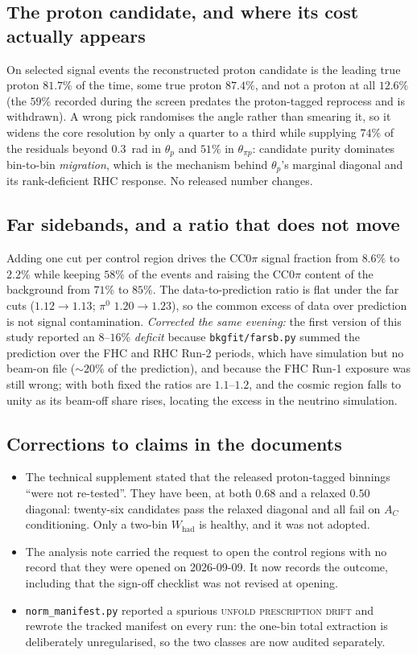 \subsection{The proton candidate, and where its cost actually appears}
On selected signal events the reconstructed proton candidate is the leading true proton $81.7\%$ of
the time, some true proton $87.4\%$, and not a proton at all $12.6\%$ (the $59\%$ recorded during
the screen predates the proton-tagged reprocess and is withdrawn). A wrong pick randomises the angle
rather than smearing it, so it widens the core resolution by only a quarter to a third while
supplying $74\%$ of the residuals beyond $0.3$~rad in $\theta_p$ and $51\%$ in $\theta_{\pi p}$:
candidate purity dominates bin-to-bin \emph{migration}, which is the mechanism behind $\theta_p$'s
marginal diagonal and its rank-deficient RHC response. No released number changes.

\subsection{Far sidebands, and a ratio that does not move}
Adding one cut per control region drives the CC$0\pi$ signal fraction from $8.6\%$ to $2.2\%$ while
keeping $58\%$ of the events and raising the CC$0\pi$ content of the background from $71\%$ to
$85\%$. The data-to-prediction ratio is flat under the far cuts ($1.12\to1.13$; $\pi^0$
$1.20\to1.23$), so the common excess of data over prediction is not signal contamination.
\emph{Corrected the same evening:} the first version of this study reported an $8$--$16\%$
\emph{deficit} because \texttt{bkgfit/farsb.py} summed the prediction over the FHC and RHC Run-2
periods, which have simulation but no beam-on file ($\sim20\%$ of the prediction), and because the
FHC Run-1 exposure was still wrong; with both fixed the ratios are $1.1$--$1.2$, and the cosmic region
falls to unity as its beam-off share rises, locating the excess in the neutrino simulation.

\subsection{Corrections to claims in the documents}
\begin{itemize}\itemsep2pt
  \item The technical supplement stated that the released proton-tagged binnings ``were not
    re-tested''. They have been, at both $0.68$ and a relaxed $0.50$ diagonal: twenty-six candidates
    pass the relaxed diagonal and all fail on $A_C$ conditioning. Only a two-bin $W_\mathrm{had}$ is
    healthy, and it was not adopted.
  \item The analysis note carried the request to open the control regions with no record that they
    were opened on 2026-09-09. It now records the outcome, including that the sign-off checklist
    was not revised at opening.
  \item \sloppy \texttt{norm\_manifest.py} reported a spurious \textsc{unfold prescription drift} and
    rewrote the tracked manifest on every run: the one-bin total extraction is deliberately
    unregularised, so the two classes are now audited separately.
\end{itemize}

